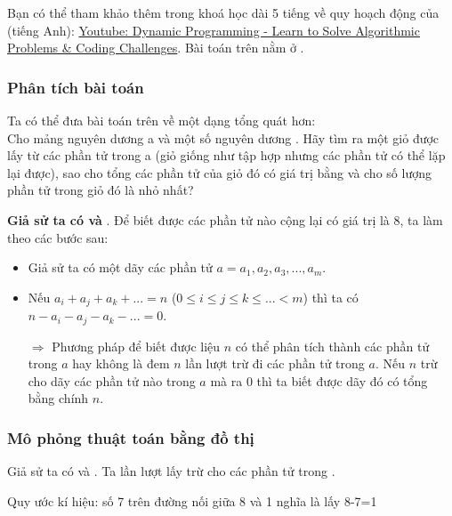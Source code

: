 \documentclass[main.tex]{subfiles}
\begin{document}
Bạn có thể tham khảo thêm trong khoá học dài 5 tiếng về quy hoạch động của  (tiếng Anh): \href{https://www.youtube.com/watch?v=oBt53YbR9Kk}{Youtube: Dynamic Programming - Learn to Solve Algorithmic Problems \& Coding Challenges}. Bài toán trên nằm ở .

\subsubsection{Phân tích bài toán}
Ta có thể đưa bài toán trên về một dạng tổng quát hơn:\\
Cho mảng nguyên dương \code a và một số nguyên dương . Hãy tìm ra một giỏ được lấy từ các phần tử trong \code a (giỏ giống như tập hợp nhưng các phần tử có thể lặp lại được), sao cho tổng các phần tử của giỏ đó có giá trị bằng  và cho số lượng phần tử trong giỏ đó là nhỏ nhất?

\textbf{Giả sử ta có  và }. Để biết được các phần tử nào cộng lại có giá trị là 8, ta làm theo các bước sau:
\begin{itemize}
    \item Giả sử ta có một dãy các phần tử  $a = {a_1, a_2, a_3, ..., a_m}$.
    \item Nếu $a_i+a_j+a_k+...=n$ ($0 \le i \le j \le k \le ... < m $) thì ta có $n-a_i-a_j-a_k-...=0$.\par
    $\Rightarrow$ Phương pháp để biết được liệu $n$ có thể phân tích thành các phần tử trong $a$ hay không là đem $n$ lần lượt trừ đi các phần tử trong $a$. Nếu $n$ trừ cho dãy các phần tử nào trong $a$ mà ra $0$ thì ta biết được dãy đó có tổng bằng chính $n$.
\end{itemize}

\subsubsection{Mô phỏng thuật toán bằng đồ thị}
Giả sử ta có  và .
Ta lần lượt lấy  trừ cho các phần tử trong .

\begin{center}
\par Quy ước kí hiệu: số 7 trên đường nối giữa 8 và 1 nghĩa là lấy 8-7=1
\end{center}
\end{document}
